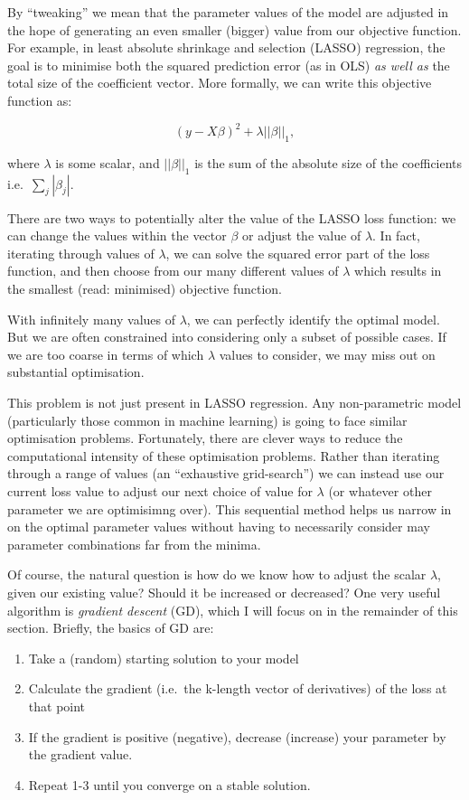 \documentclass[
]{book}
\providecommand{\tightlist}{%
  \setlength{\itemsep}{0pt}\setlength{\parskip}{0pt}}
\begin{document}
By ``tweaking'' we mean that the parameter values of the model are adjusted in the hope of generating an even smaller (bigger) value from our objective function. For example, in least absolute shrinkage and selection (LASSO) regression, the goal is to minimise both the squared prediction error (as in OLS) \emph{as well as} the total size of the coefficient vector. More formally, we can write this objective function as:

\[
(y-X\beta)^2 + \lambda||\beta||_1,
\]

where \(\lambda\) is some scalar, and \(||\beta||_1\) is the sum of the absolute size of the coefficients i.e.~\(\sum_j|\beta_j|\).

There are two ways to potentially alter the value of the LASSO loss function: we can change the values within the vector \(\beta\) or adjust the value of \(\lambda\). In fact, iterating through values of \(\lambda\), we can solve the squared error part of the loss function, and then choose from our many different values of \(\lambda\) which results in the smallest (read: minimised) objective function.

With infinitely many values of \(\lambda\), we can perfectly identify the optimal model. But we are often constrained into considering only a subset of possible cases. If we are too coarse in terms of which \(\lambda\) values to consider, we may miss out on substantial optimisation.

This problem is not just present in LASSO regression. Any non-parametric model (particularly those common in machine learning) is going to face similar optimisation problems. Fortunately, there are clever ways to reduce the computational intensity of these optimisation problems. Rather than iterating through a range of values (an ``exhaustive grid-search'') we can instead use our current loss value to adjust our next choice of value for \(\lambda\) (or whatever other parameter we are optimisimng over). This sequential method helps us narrow in on the optimal parameter values without having to necessarily consider may parameter combinations far from the minima.

Of course, the natural question is how do we know how to adjust the scalar \(\lambda\), given our existing value? Should it be increased or decreased? One very useful algorithm is \emph{gradient descent} (GD), which I will focus on in the remainder of this section. Briefly, the basics of GD are:

\begin{enumerate}
\def\labelenumi{\arabic{enumi}.}
\tightlist
\item
  Take a (random) starting solution to your model
\item
  Calculate the gradient (i.e.~the k-length vector of derivatives) of the loss at that point
\item
  If the gradient is positive (negative), decrease (increase) your parameter by the gradient value.
\item
  Repeat 1-3 until you converge on a stable solution.
\end{enumerate}
\end{document}
